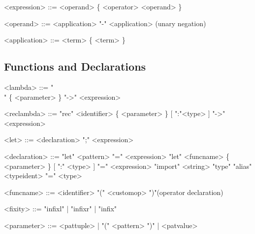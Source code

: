 \documentclass{article}
\begin{document}
\begin{grammar}
  <expression> ::= <operand> \{ <operator> \textvisiblespace <operand> \}

  <operand> ::= <application>
  \alt "-" \textvisiblespace <application> \hfill (unary negation)

  <application> ::= <term> \textvisiblespace \{ <term> \textvisiblespace \}
\end{grammar}

\subsection{Functions and Declarations}

\begin{grammar}
  <lambda> ::= "\\" \textvisiblespace \{ <parameter> \} "->" \textvisiblespace <expression>
\end{grammar}

\begin{grammar}
  <reclambda> ::= "rec" \textvisiblespace <identifier> \textvisiblespace \{ <parameter> \} [ ":"\textvisiblespace <type> ] "->" \textvisiblespace <expression>
\end{grammar}

\begin{grammar}
  <let> ::= <declaration> ";" \textvisiblespace <expression>
\end{grammar}

\begin{grammar}
  <declaration> ::= "let" \textvisiblespace <pattern> "=" \textvisiblespace <expression>
  \alt "let"  <funcname> \{ <parameter> \} [ ":" \textvisiblespace <type> ] "=" \textvisiblespace <expression>
  \alt "import" \textvisiblespace <string> \textvisiblespace
  \alt "type" \textvisiblespace "alias" \textvisiblespace <typeident> \textvisiblespace "=" \textvisiblespace <type>

  <funcname> ::= <identifier> \textvisiblespace
    "(" \textvisiblespace <customop> \textvisiblespace ")"\textvisiblespace \hfill (operator declaration)

  <fixity> ::= "infixl" | "infixr" | "infix"
\end{grammar}

\begin{grammar}
  <parameter> ::= <pattuple> \textvisiblespace | "(" \textvisiblespace <pattern> ")" \textvisiblespace | <patvalue> \textvisiblespace
\end{grammar}
\end{document}
